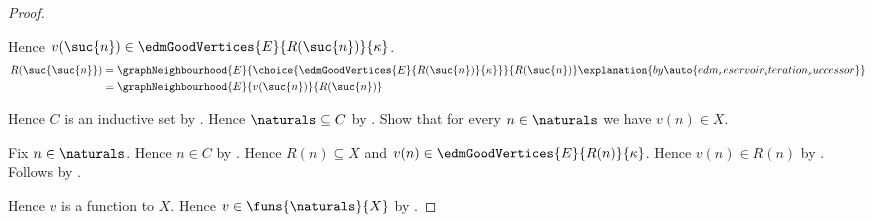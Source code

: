 \begin{proof}
\begin{subproof}
        Hence $v(\suc{n})\in
            \edmGoodVertices{E}{R(\suc{n})}{\kappa}$.
        \begin{align*}
            R(\suc{\suc{n}})
                &= \graphNeighbourhood{E}
                    {\choice{\edmGoodVertices{E}{R(\suc{n})}{\kappa}}}
                    {R(\suc{n})}
                    \explanation{by
                        \auto{edm_reservoir_iteration_successor}}
                \\
                &= \graphNeighbourhood{E}{v(\suc{n})}{R(\suc{n})}
        \end{align*}
    \end{subproof}
    Hence $C$ is an inductive set by .
    Hence $\naturals\subseteq C$ by .
    Show that for every $n\in\naturals$ we have $v(n)\in X$.
    \begin{subproof}
        Fix $n\in\naturals$.
        Hence $n\in C$ by .
        Hence $R(n)\subseteq X$ and
            $v(n)\in\edmGoodVertices{E}{R(n)}{\kappa}$.
        Hence $v(n)\in R(n)$ by .
        Follows by .
    \end{subproof}
    Hence $v$ is a function to $X$.
    Hence $v\in\funs{\naturals}{X}$ by .


\end{proof}
